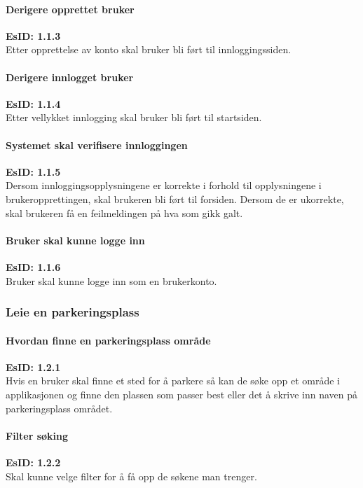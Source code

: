 \documentclass[12pt]{article}
\begin{document}
            \paragraph{Derigere opprettet bruker}
            \textbf{EsID: 1.1.3}\\Etter opprettelse av konto skal bruker bli ført til innloggingssiden.

            \paragraph{Derigere innlogget bruker}
            \textbf{EsID: 1.1.4}\\Etter vellykket innlogging skal bruker bli ført til startsiden.

            \paragraph{Systemet skal verifisere innloggingen}
            \textbf{EsID: 1.1.5}\\Dersom innloggingsopplysningene er korrekte i forhold til opplysningene i brukeropprettingen, skal brukeren bli ført til forsiden. Dersom de er ukorrekte, skal brukeren få en feilmeldingen på hva som gikk galt.

            \paragraph{Bruker skal kunne logge inn}
            \textbf{EsID: 1.1.6}\\Bruker skal kunne logge inn som en brukerkonto.
        
        \subsubsection{Leie en parkeringsplass}

            \paragraph{Hvordan finne en parkeringsplass område}
            \textbf{EsID: 1.2.1}\\Hvis en bruker skal finne et sted for å parkere så kan de søke opp et område i applikasjonen og finne den plassen som passer best eller det å skrive inn naven på parkeringsplass området.

            \paragraph{Filter søking}
            \textbf{EsID: 1.2.2}\\Skal kunne velge filter for å få opp de søkene man trenger.
\end{document}
